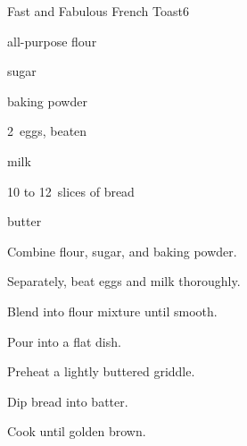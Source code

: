 \begin{recipe}{Fast and Fabulous French Toast}{}{6}

\begin{ingredients}
\item {} all-purpose flour
\item {} sugar
\item {} baking powder
\item 2~eggs, beaten
\item \C{1\half} milk
\item 10 to 12~slices of bread
\item butter
\end{ingredients}

\begin{directions}
\item Combine flour, sugar, and baking powder.
\item Separately, beat eggs and milk thoroughly.
\item Blend into flour mixture until smooth.
\item Pour into a flat dish.
\item Preheat a lightly buttered griddle.
\item Dip bread into batter.
\item Cook until golden brown.
\end{directions}

\end{recipe}
